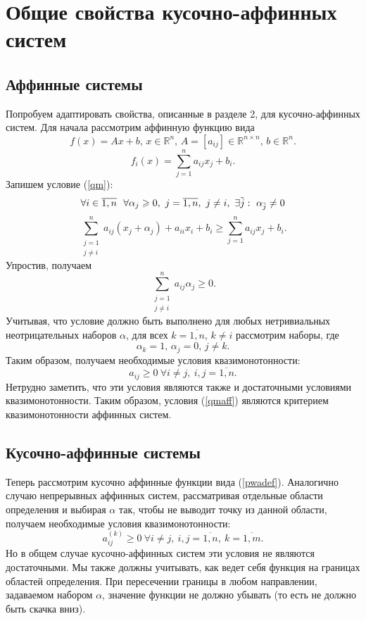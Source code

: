 \documentclass{article}
\renewcommand{\ge}{\geqslant}
\theoremstyle{definition}
\begin{document}
\section{Общие свойства кусочно-аффинных систем}

\subsection{Аффинные системы}
Попробуем адаптировать свойства, описанные в разделе 2, для кусочно-аффинных систем. Для начала рассмотрим аффинную функцию вида
	\[f(x) = Ax + b,\, x \in \mathbb{R}^{n},\, A=[a_{ij}] \in \mathbb{R}^{n \times n},\, b \in \mathbb{R}^{n}.\]
\[f_i(x) = \sum_{j=1}^{n} a_{ij}x_j + b_i.\]
Запишем условие (\ref{qm}):
\[\forall i \in \overline{1,n}\ \ \forall \alpha_j \ge 0,\ j = \overline{1,n},\ j \ne i,\ \exists \tilde j:\ \alpha_{\tilde j} \ne 0 \\\]
\[\sum_{\substack{j=1 \\ j \neq i}}^{n} a_{ij}(x_j + \alpha_j) + a_{ii}x_i + b_i \ge \sum_{j=1}^{n} a_{ij}x_j + b_i.\]
Упростив, получаем
\[\sum_{\substack{j=1 \\ j \neq i}}^{n} a_{ij}\alpha_j \ge 0.\]
Учитывая, что условие должно быть выполнено для любых нетривиальных неотрицательных наборов \(\alpha\), для всех \(k = \overline{1, n},\, k \neq i\) рассмотрим наборы, где
\[\alpha_k = 1,\, \alpha_j = 0,\, j \neq k.\]
Таким образом, получаем необходимые условия квазимонотонности:
\begin{equation} \label{qmaff}
	a_{ij} \ge 0\ \forall i \neq j,\ i,j = \overline{1, n}.
\end{equation}
Нетрудно заметить, что эти условия являются также и достаточными условиями квазимонотонности. Таким образом, условия (\ref{qmaff}) являются критерием квазимонотонности аффинных систем.
\subsection{Кусочно-аффинные системы}
Теперь рассмотрим кусочно аффинные функции вида (\ref{pwadef}).
Аналогично случаю непрерывных аффинных систем, рассматривая отдельные области определения и выбирая \(\alpha\) так, чтобы не выводит точку из данной области, получаем необходимые условия квазимонотонности:
\begin{equation} \label{qmpwaff}
	a_{ij}^{(k)} \ge 0\ \forall i \neq j,\ i,j = \overline{1, n},\ k = \overline{1, m}.
\end{equation}
Но в общем случае кусочно-аффинных систем эти условия не являются достаточными. Мы также должны учитывать, как ведет себя функция на границах областей определения. При пересечении границы в любом направлении, задаваемом набором \(\alpha\), значение функции не должно убывать (то есть не должно быть скачка вниз). 
\end{document}
